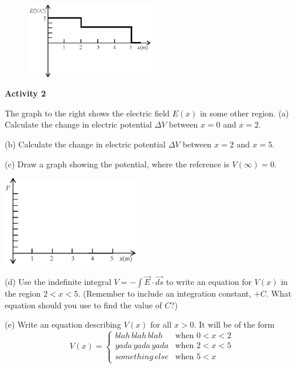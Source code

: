 \pagebreak
\begin{figure}
    \includegraphics[width=0.5\textwidth]{finding_v_from_e/fig3.eps}
\end{figure}

\textbf{Activity 2} 

The graph to the right shows the electric field $E(x)$ in some other region.
(a) Calculate the change in electric potential $\Delta V$ between $x=0$ and $x=2$.
\vspace{0.7in}

(b) Calculate the change in electric potential $\Delta V$ between $x=2$ and $x=5$.
\vspace{0.7in}

(c) Draw a graph showing the potential, where the reference is $V(\infty)=0$.
\begin{center}
\includegraphics[width=0.45\textwidth]{finding_v_from_e/fig4.eps}
\end{center}

(d) Use the indefinite integral $V =-\int{\vec{E} \cdot \vec{ds}}$  to write an equation for $V(x)$ in the region $2<x<5$.  (Remember to include an integration constant, $+C$.  What equation should you use to find the value of $C$?)
\vspace{1.2in}


(e) Write an equation describing $V(x)$ for all $x>0$.  It will be of the form
\begin{displaymath}
V(x) = \begin{cases}
        blah \, blah \, blah  & \textrm{when } 0<x<2\\
        yada \, yada \, yada & \textrm{when }  2<x<5\\
        something \, else & \textrm{when }  5 < x
        \end{cases}
\end{displaymath}
\vspace{1.2in}

